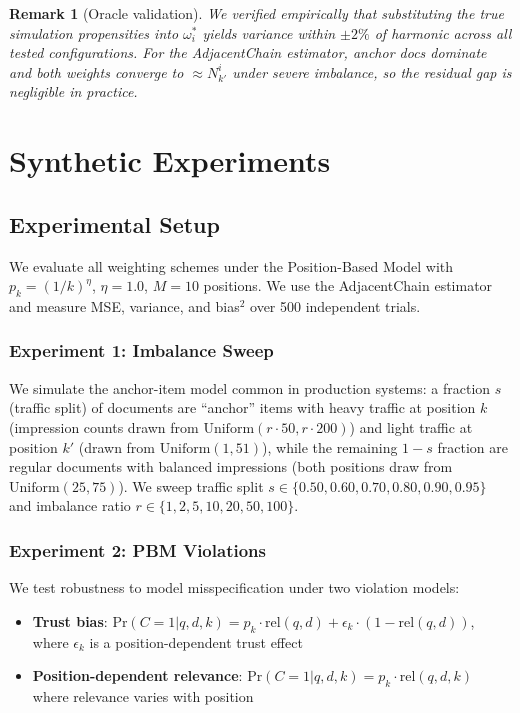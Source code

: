 \documentclass[sigconf]{acmart}
\newtheorem{remark}{Remark}
\begin{document}
\begin{remark}[Oracle validation]
\label{rem:oracle}
We verified empirically that substituting the true simulation propensities into $\omega_i^*$ yields variance within $\pm 2\%$ of harmonic across all tested configurations. For the AdjacentChain estimator, anchor docs dominate and both weights converge to $\approx N_{k'}^i$ under severe imbalance, so the residual gap is negligible in practice.
\end{remark}

\section{Synthetic Experiments}
\label{sec:synthetic}

\subsection{Experimental Setup}

We evaluate all weighting schemes under the Position-Based Model with $p_k = (1/k)^\eta$, $\eta = 1.0$, $M = 10$ positions. We use the AdjacentChain estimator \cite{agarwal2019estimating} and measure MSE, variance, and bias$^2$ over 500 independent trials.

\subsubsection{Experiment 1: Imbalance Sweep}
\label{sec:exp1}

We simulate the anchor-item model common in production systems: a fraction $s$ (traffic split) of documents are ``anchor'' items with heavy traffic at position $k$ (impression counts drawn from $\mathrm{Uniform}(r \cdot 50, r \cdot 200)$) and light traffic at position $k'$ (drawn from $\mathrm{Uniform}(1, 51)$), while the remaining $1-s$ fraction are regular documents with balanced impressions (both positions draw from $\mathrm{Uniform}(25, 75)$). We sweep traffic split $s \in \{0.50, 0.60, 0.70, 0.80, 0.90, 0.95\}$ and imbalance ratio $r \in \{1, 2, 5, 10, 20, 50, 100\}$.

\subsubsection{Experiment 2: PBM Violations}
\label{sec:exp2}

We test robustness to model misspecification under two violation models:
\begin{itemize}
\item \textbf{Trust bias}: $\mathrm{Pr}(C=1|q,d,k) = p_k \cdot \mathrm{rel}(q,d) + \epsilon_k \cdot (1 - \mathrm{rel}(q,d))$, where $\epsilon_k$ is a position-dependent trust effect \cite{agarwal2019estimating}
\item \textbf{Position-dependent relevance}: $\mathrm{Pr}(C=1|q,d,k) = p_k \cdot \mathrm{rel}(q,d,k)$ where relevance varies with position
\end{itemize}
\end{document}
